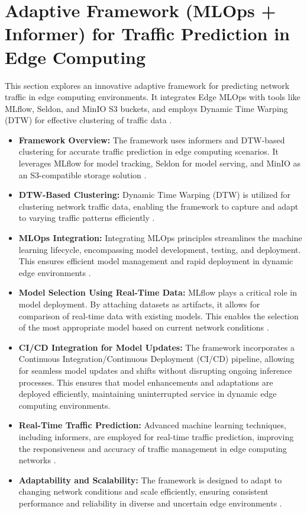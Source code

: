 \section{Adaptive Framework (MLOps + Informer) for Traffic Prediction in Edge Computing}

This section explores an innovative adaptive framework for predicting network traffic in edge computing environments. It integrates Edge MLOps \cite{9610376, 10188244} with tools like MLflow, Seldon, and MinIO S3 buckets, and employs Dynamic Time Warping (DTW) for effective clustering of traffic data \cite{Downey2023, Tuna2023, Soysal2023}.

\begin{itemize}
    \item \textbf{Framework Overview:} The framework uses informers and DTW-based clustering for accurate traffic prediction in edge computing scenarios. It leverages MLflow for model tracking, Seldon for model serving, and MinIO as an S3-compatible storage solution \cite{Downey2023}.
    
    \item \textbf{DTW-Based Clustering:} Dynamic Time Warping (DTW) is utilized for clustering network traffic data, enabling the framework to capture and adapt to varying traffic patterns efficiently \cite{Tuna2023}.
    
    \item \textbf{MLOps Integration:} Integrating MLOps principles streamlines the machine learning lifecycle, encompassing model development, testing, and deployment. This ensures efficient model management and rapid deployment in dynamic edge environments \cite{Soysal2023}.

    \item \textbf{Model Selection Using Real-Time Data:} MLflow plays a critical role in model deployment. By attaching datasets as artifacts, it allows for comparison of real-time data with existing models. This enables the selection of the most appropriate model based on current network conditions \cite{Downey2023}.

    \item \textbf{CI/CD Integration for Model Updates:} The framework incorporates a Continuous Integration/Continuous Deployment (CI/CD) pipeline, allowing for seamless model updates and shifts without disrupting ongoing inference processes. This ensures that model enhancements and adaptations are deployed efficiently, maintaining uninterrupted service in dynamic edge computing environments. 

    \item \textbf{Real-Time Traffic Prediction:} Advanced machine learning techniques, including informers, are employed for real-time traffic prediction, improving the responsiveness and accuracy of traffic management in edge computing networks \cite{Downey2023}.
    
    \item \textbf{Adaptability and Scalability:} The framework is designed to adapt to changing network conditions and scale efficiently, ensuring consistent performance and reliability in diverse and uncertain edge environments \cite{Tuna2023, Soysal2023}.
\end{itemize}

